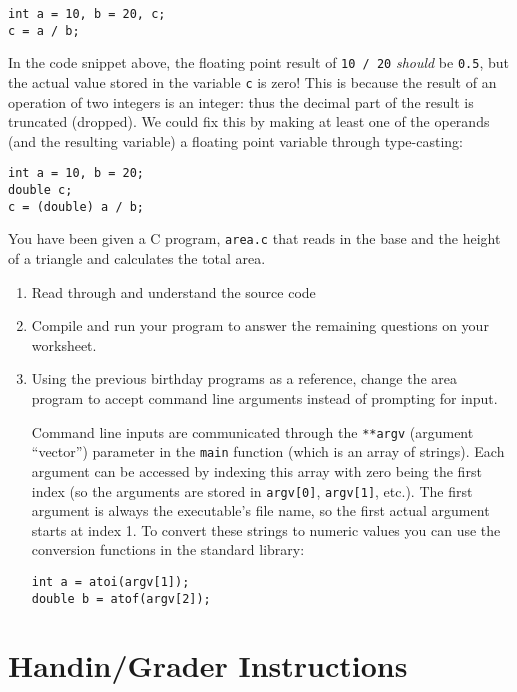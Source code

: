 \documentclass[12pt]{scrartcl}
\begin{document}
\begin{verbatim}
int a = 10, b = 20, c;
c = a / b;
\end{verbatim}

In the code snippet above, the floating point result of \texttt{10 / 20}
\emph{should} be \texttt{0.5}, but the actual value stored in the
variable \texttt{c} is zero!  This is because the result of an operation
of two integers is an integer: thus the decimal part of the result is truncated
(dropped).  We could fix this by making at least one of the operands (and
the resulting variable) a floating point variable through type-casting:

\begin{verbatim}
int a = 10, b = 20;
double c;
c = (double) a / b;
\end{verbatim}

You have been given a C program, \texttt{area.c} that reads
in the base and the height of a triangle and calculates the total area.

\begin{enumerate}
  \item Read through and understand the source code
  \item Compile and run your program to answer the remaining questions
  	on your worksheet.
  \item Using the previous birthday programs as a reference, change the
  	area program to accept command line arguments instead of prompting
	for input.
	
	Command line inputs are communicated through the 
	\texttt{**argv} (argument ``vector'') parameter in
	the \texttt{main} function (which is an array of strings).
	Each argument can be accessed by indexing this array with zero 
	being the first index (so the arguments are stored in 
	\texttt{argv[0]}, \texttt{argv[1]}, etc.).  
	The first argument is always the executable's
	file name, so the first actual argument starts at index 1.  
	To convert these strings to numeric values you can use the 
	conversion functions in the standard library:

\begin{verbatim}
int a = atoi(argv[1]);
double b = atof(argv[2]);
\end{verbatim}


\end{enumerate}

\section{Handin/Grader Instructions}
\end{document}
